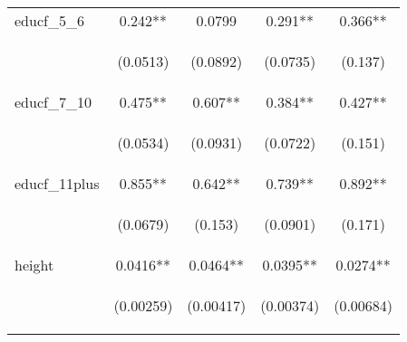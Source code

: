 \documentclass[]{article}
\begin{document}
\begin{center}
\begin{tabular}{lcccc}
educf\_5\_6 & 0.242** & 0.0799 & 0.291** & 0.366** \\
\vspace{4pt} & \begin{footnotesize}(0.0513)\end{footnotesize} & \begin{footnotesize}(0.0892)\end{footnotesize} & \begin{footnotesize}(0.0735)\end{footnotesize} & \begin{footnotesize}(0.137)\end{footnotesize} \\
educf\_7\_10 & 0.475** & 0.607** & 0.384** & 0.427** \\
\vspace{4pt} & \begin{footnotesize}(0.0534)\end{footnotesize} & \begin{footnotesize}(0.0931)\end{footnotesize} & \begin{footnotesize}(0.0722)\end{footnotesize} & \begin{footnotesize}(0.151)\end{footnotesize} \\
educf\_11plus & 0.855** & 0.642** & 0.739** & 0.892** \\
\vspace{4pt} & \begin{footnotesize}(0.0679)\end{footnotesize} & \begin{footnotesize}(0.153)\end{footnotesize} & \begin{footnotesize}(0.0901)\end{footnotesize} & \begin{footnotesize}(0.171)\end{footnotesize} \\
height & 0.0416** & 0.0464** & 0.0395** & 0.0274** \\
\vspace{4pt} & \begin{footnotesize}(0.00259)\end{footnotesize} & \begin{footnotesize}(0.00417)\end{footnotesize} & \begin{footnotesize}(0.00374)\end{footnotesize} & \begin{footnotesize}(0.00684)\end{footnotesize} \\

\end{tabular}
\end{center}
\end{document}
